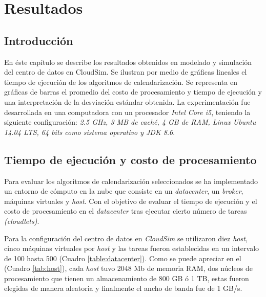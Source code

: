 \chead{}
\rhead{\thepage}


\chapter{Resultados}
\section*{Introducci\'on}

En éste capítulo se describe los resultados obtenidos en modelado y simulación del centro de datos en CloudSim. 
Se ilustran por medio de gráficas lineales el tiempo de ejecución de los algoritmos de calendarización. Se representa en gráficas de barras el promedio del costo de procesamiento y tiempo de ejecución y una interpretación de la desviación estándar obtenida. La experimentación fue desarrollada en una computadora con un procesador \textit{Intel Core i5}, teniendo la siguiente configuración: \textit{2.5 GHz, 3 MB de cach\'e, 4 GB de RAM, Linux Ubuntu 14.04 LTS, 64 bits como sistema operativo y JDK 8.6}.






\vspace{20em} 

\section{Tiempo de ejecuci\'on y costo de procesamiento}


Para evaluar los algoritmos de calendarizaci\'on seleccionados se ha implementado un entorno de c\'omputo en la nube que consiste en un \textit{datacenter}, un \textit{broker}, m\'aquinas virtuales y \textit{host}.  Con el objetivo de evaluar el tiempo de ejecuci\'on y el costo de procesamiento en el \textit{datacenter} tras ejecutar cierto n\'umero de tareas \textit{(cloudlets)}.

Para la configuraci\'on del centro de datos en \textit{CloudSim} se utilizaron diez \textit{host}, cinco m\'aquinas virtuales por \textit{host} y las tareas fueron establecidas en un intervalo de 100 hasta 500 (Cuadro \ref{table:datacenter}).
Como se puede apreciar en el (Cuadro \ref{tab:host}), cada \textit{host} tuvo 2048 Mb de memoria RAM, dos n\'ucleos de procesamiento que tienen un almacenamiento de 800 GB \'o 1 TB, estas fueron elegidas de manera aleatoria y finalmente el ancho de banda fue de 1 GB/s.

